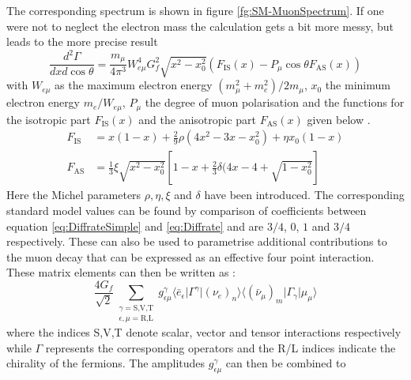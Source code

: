 The corresponding spectrum is shown in figure \ref{fg:SM-MuonSpectrum}.
If one were not to neglect the electron mass the calculation gets a bit more messy, but leads to the more precise result
\begin{equation}
\frac{d^2\Gamma}{dxd\cos\theta}=\frac{m_\mu}{4\pi^3} W_{e\mu}^4G_f^2\sqrt{x^2-x_0^2}\left(F_{\text{IS}}(x)-P_\mu\cos\theta F_{\text{AS}}(x)\right)
\label{eq:Diffrate}
\end{equation}
 with $W_{e\mu}$ as the maximum electron energy $(m_\mu^2+m_e^2)/2m_\mu$, $x_0$ the minimum electron energy $m_e/W_{e\mu}$, $P_\mu$ the degree of muon polarisation and the functions for the isotropic part $F_\text{IS}(x)$ and the anisotropic part $F_\text{AS}(x)$ given below \cite{Patrignani:2016xqp}.
\begin{align*}
F_\text{IS}&=x(1-x)+\frac{2}{9}\rho(4x^2-3x-x_0^2)+\eta x_0(1-x)\\
F_\text{AS}&=\frac{1}{3}\xi\sqrt{x^2-x_0^2}\left[1-x+\frac{2}{3}\delta(4x-4+\sqrt{1-x_0^2}\right]
\end{align*} 
Here the Michel parameters $\rho,\eta,\xi$ and $\delta$ have been introduced. The corresponding standard model values can be found by comparison of coefficients between equation \ref{eq:DiffrateSimple} and \ref{eq:Diffrate} and are $3/4$, $0$, $1$ and  $3/4$ respectively.
These can also be used to parametrise additional contributions to the muon decay that can be expressed as an effective four point interaction. These matrix elements can then be written as \cite{Patrignani:2016xqp}:
\begin{equation}
\frac{4G_f}{\sqrt{2}}\sum_{\substack{\gamma=\text{S,V,T}\\\epsilon,\mu = \text{R,L}}}g_{\epsilon\mu}^\gamma \langle\bar{e}_\epsilon \lvert \Gamma^\gamma \lvert (\nu_e)_n \rangle\langle (\bar{\nu}_\mu)_m \lvert \Gamma_\gamma \lvert \mu_\mu \rangle
\end{equation}
where the indices S,V,T denote scalar, vector and tensor interactions respectively while $\Gamma$ represents the corresponding operators and the R/L indices indicate the chirality of the fermions.
The amplitudes $g_{\epsilon\mu}^\gamma$ can then be combined to 
